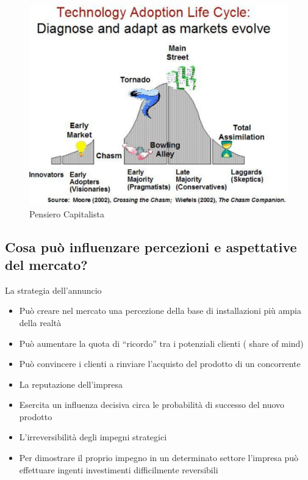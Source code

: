 \documentclass{article}
\begin{document}
\begin{figure}[h!]
	\centering
	\includegraphics[scale=0.3]{images/Markadopters.png}
	\caption{Pensiero Capitalista}
	\label{fig:cap}
\end{figure} 

\subsection{Cosa può influenzare percezioni e aspettative del mercato?}
La strategia dell’annuncio
\begin{itemize}
	\item Può creare nel mercato una percezione della base di installazioni più
	ampia della realtà
	\item Può aumentare la quota di “ricordo” tra i potenziali clienti ( share of mind)
	\item Può convincere i clienti a rinviare l’acquisto del prodotto di un
	concorrente
	\item La reputazione dell’impresa
	\item Esercita un influenza decisiva circa le probabilità di successo del nuovo
	prodotto
	\item L’irreversibilità degli impegni strategici
	\item Per dimostrare il proprio impegno in un determinato settore l’impresa può
	effettuare ingenti investimenti difficilmente reversibili
	
\end{itemize}
\end{document}
